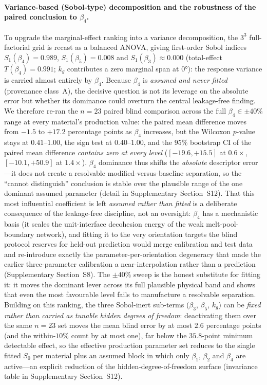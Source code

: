 \documentclass[twocolumn]{sagej}
\begin{document}
\paragraph{Variance-based (Sobol-type) decomposition and the robustness of the paired conclusion to $\beta_4$.} To upgrade the marginal-effect ranking into a variance decomposition, the $3^3$ full-factorial grid is recast as a balanced ANOVA, giving first-order Sobol indices $S_1(\beta_4) = 0.989$, $S_1(\beta_5) = 0.008$ and $S_1(\beta_3) \approx 0.000$ (total-effect $T(\beta_4) = 0.991$; $k_g$ contributes a zero marginal span at $\ang{0}$): the response variance is carried almost entirely by $\beta_4$. Because $\beta_4$ is \emph{assumed and never fitted} (provenance class~A), the decisive question is not its leverage on the absolute error but whether its dominance could overturn the central leakage-free finding. We therefore re-ran the $n = 23$ paired blind comparison across the full $\beta_4 \in \pm 40\%$ range at every material's production value: the paired mean difference moves from $-1.5$ to $+17.2$ percentage points as $\beta_4$ increases, but the Wilcoxon $p$-value stays at $0.41$--$1.00$, the sign test at $0.40$--$1.00$, and the $95\%$ bootstrap CI of the paired mean difference \emph{contains zero at every level} ($[-19.6,+15.5]$ at $0.6\times$, $[-10.1,+50.9]$ at $1.4\times$). $\beta_4$ dominance thus shifts the \emph{absolute} descriptor error---it does not create a resolvable modified-versus-baseline separation, so the ``cannot distinguish'' conclusion is stable over the plausible range of the one dominant assumed parameter (detail in Supplementary Section~S12). That this most influential coefficient is left \emph{assumed rather than fitted} is a deliberate consequence of the leakage-free discipline, not an oversight: $\beta_4$ has a mechanistic basis (it scales the unit-interface decohesion energy of the weak melt-pool-boundary network), and fitting it to the very orientation targets the blind protocol reserves for held-out prediction would merge calibration and test data and re-introduce exactly the parameter-per-orientation degeneracy that made the earlier three-parameter calibration a near-interpolation rather than a prediction (Supplementary Section~S8). The $\pm40\%$ sweep is the honest substitute for fitting it: it moves the dominant lever across its full plausible physical band and shows that even the most favourable level fails to manufacture a resolvable separation. Building on this ranking, the three Sobol-inert sub-terms ($\beta_3$, $\beta_5$, $k_g$) can be \emph{fixed rather than carried as tunable hidden degrees of freedom}: deactivating them over the same $n = 23$ set moves the mean blind error by at most $2.6$ percentage points (and the within-$10\%$ count by at most one), far below the $35.8$-point minimum detectable effect, so the effective production parameter set reduces to the single fitted $S_0$ per material plus an assumed block in which only $\beta_1$, $\beta_2$ and $\beta_4$ are active---an explicit reduction of the hidden-degree-of-freedom surface (invariance table in Supplementary Section~S12).
\end{document}
